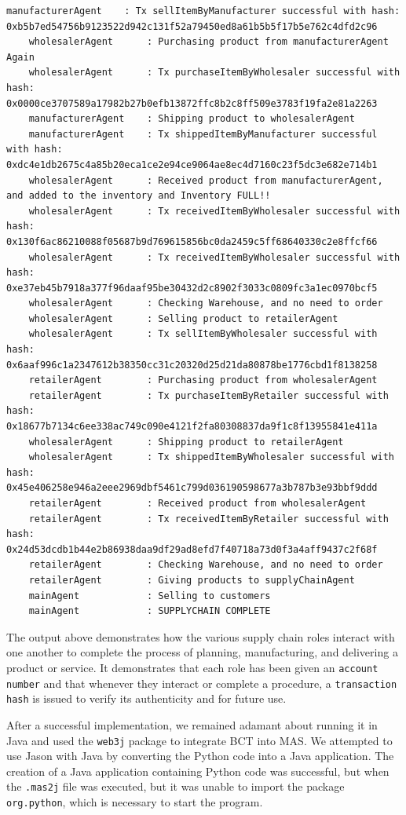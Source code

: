 \begin{itemize}
\begin{lstlisting}[numbers=none, basicstyle=\ttfamily\tiny]
    manufacturerAgent    : Tx sellItemByManufacturer successful with hash: 0xb5b7ed54756b9123522d942c131f52a79450ed8a61b5b5f17b5e762c4dfd2c96
    wholesalerAgent      : Purchasing product from manufacturerAgent Again
    wholesalerAgent      : Tx purchaseItemByWholesaler successful with hash: 0x0000ce3707589a17982b27b0efb13872ffc8b2c8ff509e3783f19fa2e81a2263
    manufacturerAgent    : Shipping product to wholesalerAgent
    manufacturerAgent    : Tx shippedItemByManufacturer successful with hash: 0xdc4e1db2675c4a85b20eca1ce2e94ce9064ae8ec4d7160c23f5dc3e682e714b1
    wholesalerAgent      : Received product from manufacturerAgent, and added to the inventory and Inventory FULL!!
    wholesalerAgent      : Tx receivedItemByWholesaler successful with hash: 0x130f6ac86210088f05687b9d769615856bc0da2459c5ff68640330c2e8ffcf66
    wholesalerAgent      : Tx receivedItemByWholesaler successful with hash: 0xe37eb45b7918a377f96daaf95be30432d2c8902f3033c0809fc3a1ec0970bcf5
    wholesalerAgent      : Checking Warehouse, and no need to order
    wholesalerAgent      : Selling product to retailerAgent
    wholesalerAgent      : Tx sellItemByWholesaler successful with hash: 0x6aaf996c1a2347612b38350cc31c20320d25d21da80878be1776cbd1f8138258
    retailerAgent        : Purchasing product from wholesalerAgent
    retailerAgent        : Tx purchaseItemByRetailer successful with hash: 0x18677b7134c6ee338ac749c090e4121f2fa80308837da9f1c8f13955841e411a
    wholesalerAgent      : Shipping product to retailerAgent
    wholesalerAgent      : Tx shippedItemByWholesaler successful with hash: 0x45e406258e946a2eee2969dbf5461c799d036190598677a3b787b3e93bbf9ddd
    retailerAgent        : Received product from wholesalerAgent
    retailerAgent        : Tx receivedItemByRetailer successful with hash: 0x24d53dcdb1b44e2b86938daa9df29ad8efd7f40718a73d0f3a4aff9437c2f68f
    retailerAgent        : Checking Warehouse, and no need to order
    retailerAgent        : Giving products to supplyChainAgent
    mainAgent            : Selling to customers
    mainAgent            : SUPPLYCHAIN COMPLETE
    \end{lstlisting}
    
    \end{itemize}


The output above demonstrates how the various supply chain roles interact with one another to complete the process of planning, manufacturing, and delivering a product or service. It demonstrates that each role has been given an \texttt{account number} and that whenever they interact or complete a procedure, a \texttt{transaction hash} is issued to verify its authenticity and for future use.

\vspace{.5cm}

After a successful implementation, we remained adamant about running it in Java and used the \texttt{web3j} package to integrate \ac{BCT} into \ac{MAS}. We attempted to use Jason with Java by converting the Python code into a Java application. The creation of a Java application containing Python code was successful, but when the \texttt{.mas2j} file was executed, but it was unable to import the package \texttt{org.python}, which is necessary to start the program.